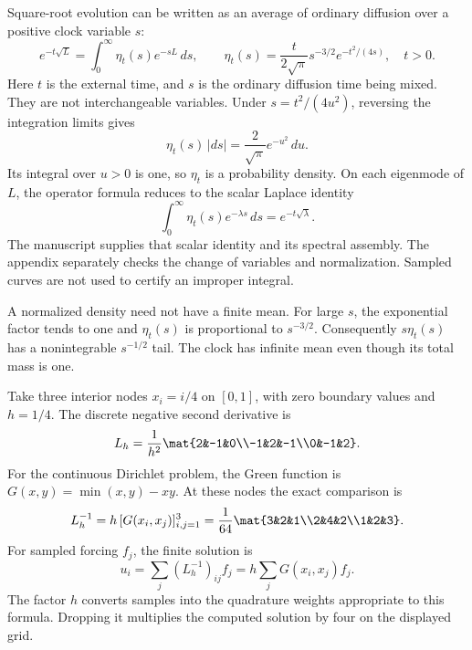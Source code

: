 Square-root evolution can be written as an average of ordinary diffusion over a positive clock variable $s$:
\[
e^{-t\sqrt L}=\int_0^\infty \eta_t(s)e^{-sL}\,ds,
\qquad
\eta_t(s)=\frac{t}{2\sqrt\pi}s^{-3/2}e^{-t^2/(4s)},\quad t>0.
\]
Here $t$ is the external time, and $s$ is the ordinary diffusion time being mixed. They are not interchangeable variables.
Under $s=t^2/(4u^2)$, reversing the integration limits gives
\[
\eta_t(s)\,|ds|=\frac2{\sqrt\pi}e^{-u^2}\,du.
\]
Its integral over $u>0$ is one, so $\eta_t$ is a probability density. On each eigenmode of $L$, the operator formula reduces to the scalar Laplace identity
\[
\int_0^\infty\eta_t(s)e^{-\lambda s}\,ds=e^{-t\sqrt\lambda}.
\]
The manuscript supplies that scalar identity and its spectral assembly. The appendix separately checks the change of variables and normalization. Sampled curves are not used to certify an improper integral.

A normalized density need not have a finite mean. For large $s$, the exponential factor tends to one and $\eta_t(s)$ is proportional to $s^{-3/2}$. Consequently $s\eta_t(s)$ has a nonintegrable $s^{-1/2}$ tail. The clock has infinite mean even though its total mass is one.

Take three interior nodes $x_i=i/4$ on $[0,1]$, with zero boundary values and $h=1/4$. The discrete negative second derivative is
\[
L_h=\frac1{h^2}\mat{2&-1&0\\-1&2&-1\\0&-1&2}.
\]
For the continuous Dirichlet problem, the Green function is $G(x,y)=\min(x,y)-xy$. At these nodes the exact comparison is
\[
L_h^{-1}=h\,[G(x_i,x_j)]_{i,j=1}^3
=\frac1{64}\mat{3&2&1\\2&4&2\\1&2&3}.
\]
For sampled forcing $f_j$, the finite solution is
\[
u_i=\sum_j(L_h^{-1})_{ij}f_j
=h\sum_jG(x_i,x_j)f_j.
\]
The factor $h$ converts samples into the quadrature weights appropriate to this formula. Dropping it multiplies the computed solution by four on the displayed grid.


